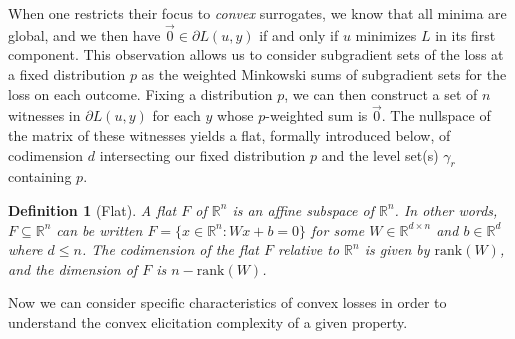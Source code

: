 \documentclass{article}
\newcommand{\reals}{\mathbb{R}}
\newtheorem{definition}{Definition}
\begin{document}
When one restricts their focus to \emph{convex} surrogates, we know that all minima are global, and we then have $\vec 0  \in \partial L(u, y)$ if and only if $u$ minimizes $L$ in its first component.
This observation allows us to consider subgradient sets of the loss at a fixed distribution $p$ as the weighted Minkowski sums of subgradient sets for the loss on each outcome.
Fixing a distribution $p$, we can then construct a set of $n$ witnesses in $\partial L(u,y)$ for each $y$ whose $p$-weighted sum is $\vec 0$.
The nullspace of the matrix of these witnesses yields a flat, formally introduced below, of codimension $d$ intersecting our fixed distribution $p$ and the level set(s) $\gamma_r$ containing $p$.

\begin{definition}[Flat]
	A \emph{flat} $F$ of $\reals^n$ is an affine subspace of $\reals^n$.
	In other words, $F\subseteq \reals^n$ can be written $F=\{x\in\reals^n : Wx + b = 0\}$ for some $W\in\reals^{d\times n}$ and $b\in\reals^d$ where $d\leq n$.
	The codimension of the flat $F$ relative to $\reals^n$ is given by $\mathrm{rank}(W)$, and the dimension of $F$ is $n - \mathrm{rank}(W)$.
\end{definition}

Now we can consider specific characteristics of convex losses in order to understand the convex elicitation complexity of a given property.
\end{document}
